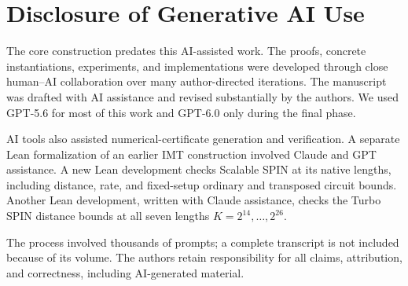 \section{Disclosure of Generative AI Use}
\label{sec:ai-disclosure}

The core construction predates this AI-assisted work. The proofs, concrete
instantiations, experiments, and implementations were developed through close
human--AI collaboration over many author-directed iterations. The manuscript
was drafted with AI assistance and revised substantially by the authors.
We used GPT-5.6 for most of this work and GPT-6.0 only during the final phase.

AI tools also assisted numerical-certificate generation and verification.
A separate Lean formalization of an earlier IMT construction involved
Claude and GPT assistance. A new Lean development checks Scalable SPIN at its
native lengths, including distance, rate, and fixed-setup ordinary and
transposed circuit bounds. Another Lean development, written with Claude
assistance, checks the Turbo SPIN distance bounds at all seven lengths
$K=2^{14},\ldots,2^{26}$.

The process involved thousands of prompts; a complete transcript is not
included because of its volume. The authors retain responsibility for all
claims, attribution, and correctness, including AI-generated material.
